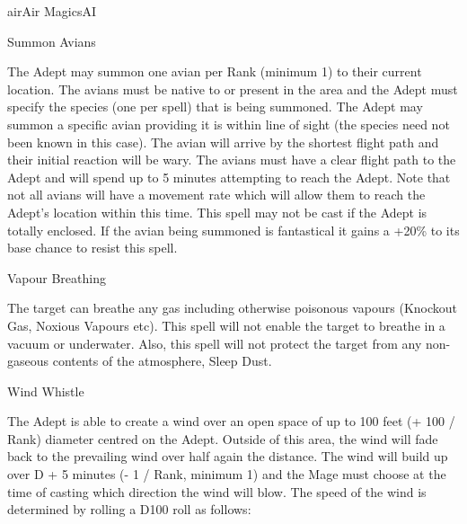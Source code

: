\begin{college}[2.1]{air}{Air Magics}{AI}
\begin{spell}[G-7]{Summon Avians}

\begin{effects}
The Adept may summon one avian per Rank (minimum 1) to their current
location. The avians must be native to or present in the area and the
Adept must specify the species (one per spell) that is being
summoned. The Adept may summon a specific avian providing it is within
line of sight (the species need not been known in this case). The
avian will arrive by the shortest flight path and their initial
reaction will be wary. The avians must have a clear flight path to the
Adept and will spend up to 5 minutes attempting to reach the
Adept. Note that not all avians will have a movement rate which will
allow them to reach the Adept's location within this time. This spell
may not be cast if the Adept is totally enclosed. If the avian being
summoned is fantastical it gains a +20\% to its base chance to resist
this spell.
\end{effects}
\end{spell}

\begin{spell}[G-8]{Vapour Breathing}

\begin{effects}
The target can breathe any gas including otherwise poisonous vapours
(\eg Knockout Gas, Noxious Vapours etc). This spell will not enable
the target to breathe in a vacuum or underwater. Also, this spell will
not protect the target from any non-gaseous contents of the
atmosphere, \eg Sleep Dust.
\end{effects}
\end{spell}

\begin{spell}[G-9]{Wind Whistle}

\begin{effects}
The Adept is able to create a wind over an open space of up to 100
feet (+ 100 / Rank) diameter centred on the Adept. Outside of this
area, the wind will fade back to the prevailing wind over half again
the distance. The wind will build up over D + 5 minutes (- 1 / Rank,
minimum 1) and the Mage must choose at the time of casting which
direction the wind will blow. The speed of the wind is determined by
rolling a D100 roll as follows:


\end{effects}
\end{spell}
\end{college}
